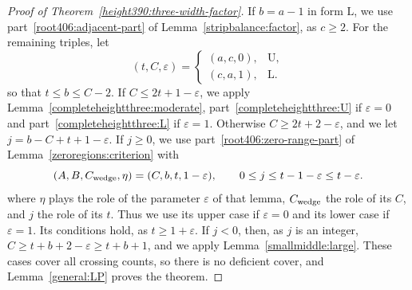 \begin{proof}[Proof of Theorem~\ref{height390:three-width-factor}]
If $b=a-1$ in form $\mathrm L$, we use
part~\ref{root406:adjacent-part} of Lemma~\ref{stripbalance:factor}, as $c\ge2$.
For the remaining triples, let
\[
 (t,C,\varepsilon)=
 \begin{cases}(a,c,0),&\mathrm U,\\(c,a,1),&\mathrm L.\end{cases}
\]
so that $t\le b\le C-2$. If $C\le2t+1-\varepsilon$, we
apply Lemma~\ref{completeheightthree:moderate}, part~\ref{completeheightthree:U} if $\varepsilon=0$ and part~\ref{completeheightthree:L} if $\varepsilon=1$. Otherwise $C\ge2t+2-\varepsilon$,
and we let $j=b-C+t+1-\varepsilon$.
If $j\ge0$, we use part~\ref{root406:zero-range-part} of Lemma~\ref{zeroregions:criterion} with
\[
 (A,B,C_{\rm wedge},\eta)=(C,b,t,1-\varepsilon),
 \qquad 0\le j\le t-1-\varepsilon\le t-\varepsilon.
\]
where $\eta$ plays the role of the parameter $\varepsilon$ of that lemma, $C_{\rm wedge}$ the role of its $C$, and $j$ the role of its $t$. Thus we use its upper case if $\varepsilon=0$ and its lower case if $\varepsilon=1$. Its conditions hold, as $t\ge1+\varepsilon$.
If $j<0$, then, as $j$ is an integer,
$C\ge t+b+2-\varepsilon\ge t+b+1$, and we apply
Lemma~\ref{smallmiddle:large}.
These cases cover all crossing counts, so there is no deficient cover, and Lemma~\ref{general:LP} proves the theorem.
\end{proof}

